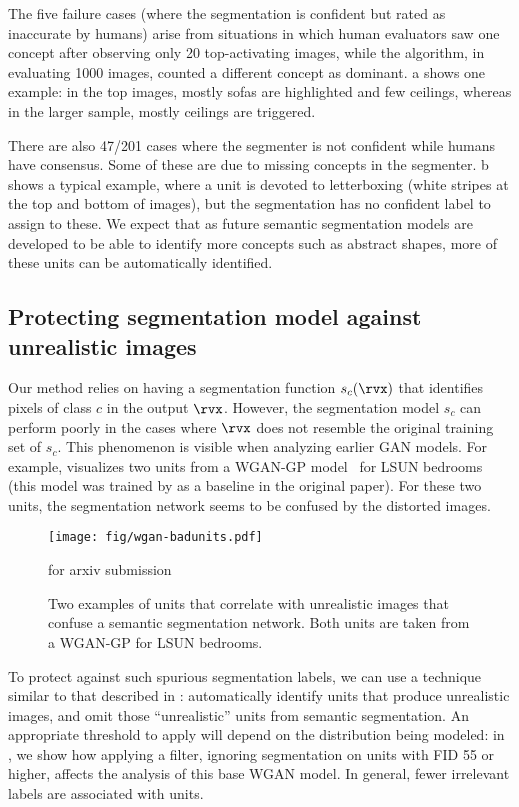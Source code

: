 \documentclass{article} %
\def\arxiv{for arxiv submission}
\begin{document}
The five failure cases (where the segmentation is confident but rated as inaccurate by humans) arise from situations in which human evaluators saw one concept after observing only 20 top-activating images, while the algorithm, in evaluating 1000 images, counted a different concept as dominant.  a shows one example: in the top images, mostly sofas are highlighted and few ceilings, whereas in the larger sample, mostly ceilings are triggered.

There are also 47/201 cases where the segmenter is not confident while humans have consensus.  Some of these are due to missing concepts in the segmenter.  b shows a typical example, where a unit is devoted to letterboxing (white stripes at the top and bottom of images), but the segmentation has no confident label to assign to these. We expect that as future semantic segmentation models are developed to be able to identify more concepts such as abstract shapes, more of these units can be automatically identified.

\subsection{Protecting segmentation model against unrealistic images}

Our method relies on having a segmentation function $s_c(\rvx)$ that identifies pixels of class $c$ in the output $\rvx$.  However, the segmentation model $s_c$ can perform poorly in the cases where $\rvx$ does not resemble the original training set of $s_c$.  This phenomenon is visible when analyzing earlier GAN models.  For example,  visualizes two units from a WGAN-GP model~\citep{gulrajani2017improved} for LSUN bedrooms (this model was trained by \cite{karras2018progressive} as a baseline in the original paper).  For these two units, the segmentation network seems to be confused by the distorted images.

\begin{figure}
\texttt{[image: fig/wgan-badunits.pdf]}
\vspace{-15pt}
\caption{Two examples of units that correlate with unrealistic images that confuse a semantic segmentation network.  Both units are taken from a WGAN-GP for LSUN bedrooms.}
\ifdefined\arxiv\else
\vspace{-3pt}
\fi
\end{figure}

To protect against such spurious segmentation labels, we can use a technique similar to that described in : automatically identify units that produce unrealistic images, and omit those ``unrealistic'' units from semantic segmentation.  An appropriate threshold to apply will depend on the distribution being modeled: in , we show how applying a filter, ignoring segmentation on units with FID 55 or higher, affects the analysis of this base WGAN model.  In general, fewer irrelevant labels are associated with units.
\end{document}
